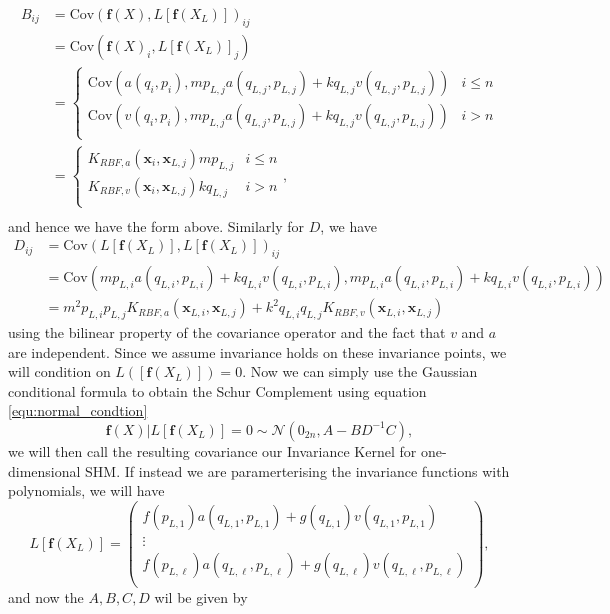 \documentclass{statsmsc}
\begin{document}
\begin{align*}
B_{ij} &= \mathrm{Cov}(\mathbf{f}(X), L[\mathbf{f}(X_L)])_{ij} \\
       &= \mathrm{Cov}(\mathbf{f}(X)_i, L[\mathbf{f}(X_L)]_j) \\ 
       &= \begin{cases}
        \mathrm{Cov}(a(q_i, p_i), mp_{L,j}a(q_{L,j},p_{L,j}) + kq_{L,j}v(q_{L,j},p_{L,j})) & i\le n \\ 
        \mathrm{Cov}(v(q_i, p_i), mp_{L,j}a(q_{L,j},p_{L,j}) + kq_{L,j}v(q_{L,j},p_{L,j})) & i>n \\ 
       \end{cases} \\
       &= \begin{cases}
        K_{RBF,a}(\mathbf{x}_i, \mathbf{x}_{L,j}) mp_{L,j} & i\le n \\ 
        K_{RBF,v}(\mathbf{x}_i, \mathbf{x}_{L,j}) kq_{L,j} & i>n \\ 
       \end{cases}, \\
\end{align*}
and hence we have the form above. 
Similarly for $D$, we have
\begin{align*}
D_{ij} &= \mathrm{Cov}(L[\mathbf{f}(X_L)], L[\mathbf{f}(X_L)])_{ij} \\
       &= \mathrm{Cov}(mp_{L,i}a(q_{L,i},p_{L,i}) + kq_{L,i}v(q_{L,i},p_{L,i}), mp_{L,i}a(q_{L,i},p_{L,i}) + kq_{L,i}v(q_{L,i},p_{L,i})) \\
       &= m^2p_{L,i}p_{L,j}K_{RBF,a}(\mathbf{x}_{L,i},\mathbf{x}_{L,j}) + k^2q_{L,i}q_{L,j}K_{RBF,v}(\mathbf{x}_{L,i},\mathbf{x}_{L,j})
\end{align*}
using the bilinear property of the covariance operator and the fact that $v$ and $a$ are independent.
Since we assume invariance holds on these invariance points, we will condition on $L([\mathbf{f}(X_L)])=0.$
Now we can simply use the Gaussian conditional formula to obtain the Schur Complement using equation \ref{equ:normal_condtion}
\begin{equation}
\mathbf{f}(X)|L[\mathbf{f}(X_L)]=0\sim\mathcal{N}(0_{2n},A-BD^{-1}C),
\label{equ:shm_invariance}
\end{equation}
we will then call the resulting covariance our Invariance Kernel for one-dimensional SHM.
If instead we are paramerterising the invariance functions with polynomials, we will have 
\begin{equation}
L[\mathbf{f}(X_L)] = \begin{pmatrix}
   f(p_{L,1})a(q_{L,1},p_{L,1}) + g(q_{L,1})v(q_{L,1},p_{L,1})\\ 
   \vdots \\
   f(p_{L, \ell})a(q_{L,\ell},p_{L,\ell}) + g(q_{L,\ell})v(q_{L,\ell},p_{L,\ell})\\ 
\end{pmatrix},
\label{equ:joint_ABCDp}
\end{equation}
and now the $A, B, C, D$ wil be given by 
\end{document}
